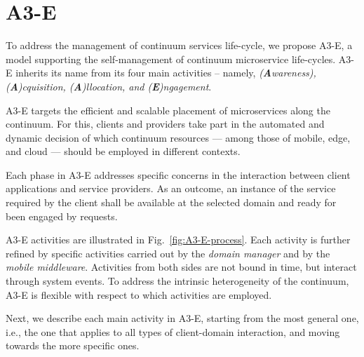 \section{A3-E}\label{sec:A3-E}


To address the management of continuum services life-cycle, we propose A3-E, a model supporting the self-management of continuum microservice life-cycles. A3-E inherits its name from its four main activities -- namely, \textit{(\textbf{A}wareness), (\textbf{A})cquisition, (\textbf{A})llocation, and (\textbf{E})ngagement}. 

A3-E targets the efficient and scalable placement of microservices along the continuum. For this, clients and providers take part in the automated and dynamic decision of which continuum resources --- among those of mobile, edge, and cloud --- should be employed in different contexts.

Each phase in A3-E addresses specific concerns in the interaction between client applications and service providers. As an outcome, an instance of the service required by the client shall be available at the selected domain and ready for been engaged by requests.

A3-E activities are illustrated in Fig.~\ref{fig:A3-E-process}. Each activity is further refined by specific activities carried out by the \textit{domain manager} and by the \textit{mobile middleware}. Activities from both sides are not bound in time, but interact through system events. To address the intrinsic heterogeneity of the continuum, A3-E is flexible with respect to which activities are employed. 


Next, we describe each main activity in A3-E, starting from the most general one, i.e., the one that applies to all types of client-domain interaction, and moving towards the more specific ones.

